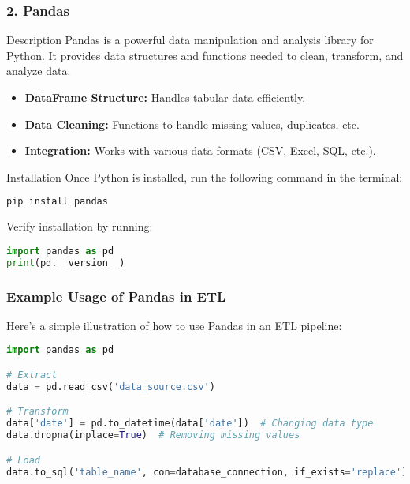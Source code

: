 \documentclass[aspectratio=169]{beamer}
\begin{document}
\begin{frame}[fragile]
    \frametitle{2. Pandas}
    \begin{block}{Description}
        Pandas is a powerful data manipulation and analysis library for Python. It provides data structures and functions needed to clean, transform, and analyze data.
    \end{block}
    
    \begin{itemize}
        \item \textbf{DataFrame Structure:} Handles tabular data efficiently.
        \item \textbf{Data Cleaning:} Functions to handle missing values, duplicates, etc.
        \item \textbf{Integration:} Works with various data formats (CSV, Excel, SQL, etc.).
    \end{itemize}

    \begin{block}{Installation}
        Once Python is installed, run the following command in the terminal: 
        \begin{lstlisting}[language=bash]
pip install pandas
        \end{lstlisting}
        Verify installation by running: 
        \begin{lstlisting}[language=python]
import pandas as pd
print(pd.__version__)
        \end{lstlisting}
    \end{block}
\end{frame}

\begin{frame}[fragile]
    \frametitle{Example Usage of Pandas in ETL}
    Here’s a simple illustration of how to use Pandas in an ETL pipeline:
    
    \begin{lstlisting}[language=python]
import pandas as pd

# Extract
data = pd.read_csv('data_source.csv')

# Transform
data['date'] = pd.to_datetime(data['date'])  # Changing data type
data.dropna(inplace=True)  # Removing missing values

# Load
data.to_sql('table_name', con=database_connection, if_exists='replace')
    \end{lstlisting}
\end{frame}
\end{document}
